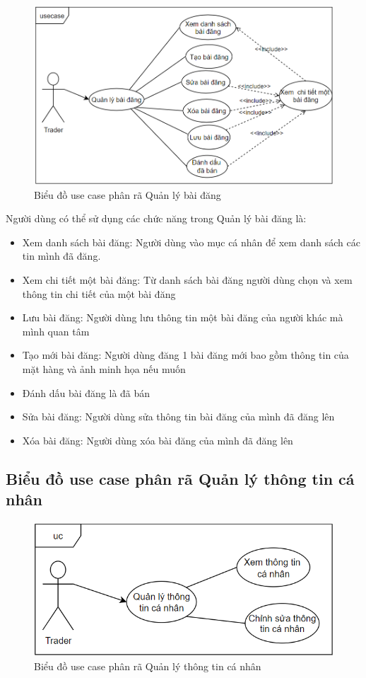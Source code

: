 \documentclass[../DoAn.tex]{subfiles}
\begin{document}
\begin{figure}[H]
\includegraphics[width=0.75\linewidth]{Hinhve/PostManage.png}
\centering
\caption{Biểu đồ use case phân rã Quản lý bài đăng}
\end{figure}
Người dùng có thể sử dụng các chức năng trong Quản lý bài đăng là:
\begin{itemize}
\item Xem danh sách bài đăng: Người dùng vào mục cá nhân để xem danh sách các tin mình đã đăng.
\item Xem chi tiết một bài đăng: Từ danh sách bài đăng người dùng chọn và xem thông tin chi tiết của một bài đăng
\item Lưu bài đăng: Người dùng lưu thông tin một bài đăng của người khác mà mình quan tâm
\item Tạo mới bài đăng: Người dùng đăng 1 bài đăng mới bao gồm thông tin của mặt hàng và ảnh minh họa nếu muốn
\item Đánh dấu bài đăng là đã bán
\item Sửa bài đăng: Người dùng sửa thông tin bài đăng của mình đã đăng lên
\item Xóa bài đăng: Người dùng xóa bài đăng của mình đã đăng lên
\end{itemize} 
\newpage

\subsection{Biểu đồ use case phân rã Quản lý thông tin cá nhân}
\label{subsection:2.2.3}
\begin{figure}[H]
\includegraphics[width=0.75\linewidth]{Hinhve/profileManage.png}
\centering
\caption{Biểu đồ use case phân rã Quản lý thông tin cá nhân}
\end{figure}
\end{document}
